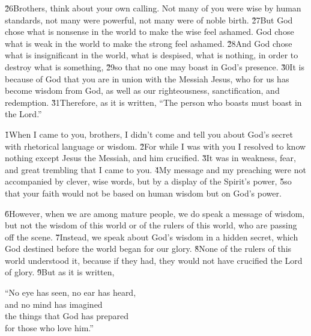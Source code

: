 \v{26}Brothers, think about your own calling. Not many of you were wise by human standards, not many were powerful, not many were of noble birth. \v{27}But God chose what is nonsense in the world to make the wise feel ashamed. God chose what is weak in the world to make the strong feel ashamed. \v{28}And God chose what is insignificant in the world, what is despised, what is nothing, in order to destroy what is something, \v{29}so that no one may boast in God's presence. \v{30}It is because of God that you are in union with the Messiah Jesus, who for us has become wisdom from God, as well as our righteousness, sanctification, and redemption. \v{31}Therefore, as it is written, ``The person who boasts must boast in the Lord.''

\v{1}When I came to you, brothers, I didn't come and tell you about God's secret with rhetorical language or wisdom. \v{2}For while I was with you I resolved to know nothing except Jesus the Messiah, and him crucified. \v{3}It was in weakness, fear, and great trembling that I came to you. \v{4}My message and my preaching were not accompanied by clever, wise words, but by a display of the Spirit's power, \v{5}so that your faith would not be based on human wisdom but on God's power.

\v{6}However, when we are among mature people, we do speak a message of wisdom, but not the wisdom of this world or of the rulers of this world, who are passing off the scene. \v{7}Instead, we speak about God's wisdom in a hidden secret, which God destined before the world began for our glory. \v{8}None of the rulers of this world understood it, because if they had, they would not have crucified the Lord of glory. \v{9}But as it is written,

\begin{poetry}
\poeml ``No eye has seen, no ear has heard, \\
\poemll    and no mind has imagined \\
\poeml the things that God has prepared \\
\poemll    for those who love him.''
\end{poetry}

